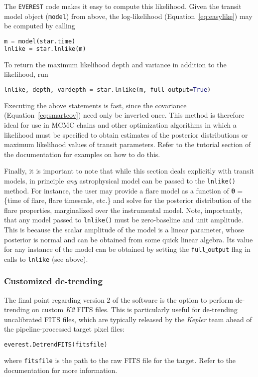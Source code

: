 \documentclass[]{aastex62}
\newenvironment{edits}{\color{red}}{\color{black}}
\begin{document}
\begin{edits}
The \texttt{EVEREST} code makes it easy to compute this likelihood.
Given the transit model object (\texttt{model}) from above, the log-likelihood
(Equation~\ref{eq:easylike}) may be computed by calling
%
\begin{lstlisting}[language=Python]
m = model(star.time)
lnlike = star.lnlike(m)
\end{lstlisting}
%
To return the maximum likelihood depth and variance in addition to the
likelihood, run
%
\begin{lstlisting}[language=Python]
lnlike, depth, vardepth = star.lnlike(m, full_output=True)
\end{lstlisting}
%
Executing the above statements
is fast, since the covariance (Equation~\ref{eq:smartcov}) need only be
inverted once. This method is therefore ideal for use in MCMC chains and other
optimization algorithms in which a likelihood must be specified to
obtain estimates of the posterior distributions or maximum likelihood values
of transit parameters. Refer to the tutorial section of the documentation for
examples on how to do this.

Finally, it is important to note that while this section deals explicitly with
transit models, in principle \emph{any} astrophysical model can be passed to
the \texttt{lnlike()} method. For instance, the user may provide a flare model
as a function of $\mathbf{\theta} =$ \{time of flare, flare timescale, etc.\}
and solve for the posterior distribution of the flare properties, marginalized
over the instrumental model. Note, importantly, that any model passed to
\texttt{lnlike()} must be zero-baseline and unit amplitude. This is because
the scalar amplitude of the model is a linear parameter, whose posterior is
normal and can be obtained from some quick linear algebra. Its value for any
instance of the model can be obtained by setting the \texttt{full$\_$output}
flag in calls to \texttt{lnlike} (see above).\\[0em]

\subsubsection{Customized de-trending}
\label{sec:custom_detrending}
The final point regarding version 2 of the software is the option to perform
de-trending on custom \emph{K2} FITS files. This is particularly useful for de-trending
uncalibrated FITS files, which are typically released by the \emph{Kepler}
team ahead of the pipeline-processed target pixel files:
%
\begin{lstlisting}[language=Python]
everest.DetrendFITS(fitsfile)
\end{lstlisting}
%
where \texttt{fitsfile} is the path to the raw FITS file for the target.
Refer to the documentation for more information.\\[0em]
\end{edits}
\end{document}
